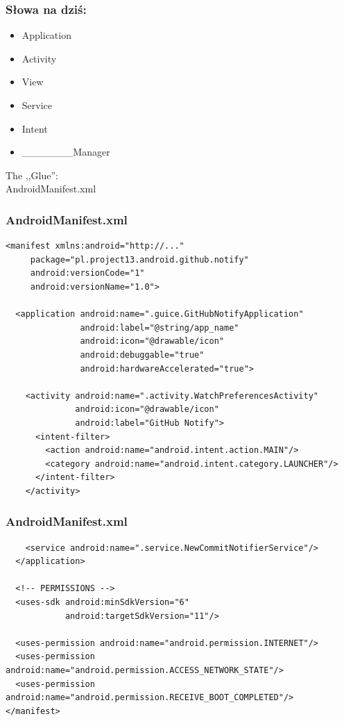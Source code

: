 \begin{frame}\frametitle{Słowa na dziś:}
 \begin{itemize}
  \item \Huge{Application}
  \item \Huge{Activity}
  \item \Huge{View}
  \item \Huge{Service}
  \item \Huge{Intent}
  \item \_\_\_\_\_\_\_\Huge{Manager}
 \end{itemize}
\end{frame}

\begin{frame}
\begin{center}
 \Huge{The ,,Glue'':}\\ 
 \Huge{AndroidManifest.xml}
\end{center}

\end{frame}


\begin{frame}[fragile]\frametitle{AndroidManifest.xml}
\begin{lstlisting}
<manifest xmlns:android="http://..."
     package="pl.project13.android.github.notify"
     android:versionCode="1"
     android:versionName="1.0">

  <application android:name=".guice.GitHubNotifyApplication"
               android:label="@string/app_name"
               android:icon="@drawable/icon"
               android:debuggable="true"
               android:hardwareAccelerated="true">

    <activity android:name=".activity.WatchPreferencesActivity"
              android:icon="@drawable/icon"
              android:label="GitHub Notify">
      <intent-filter>
        <action android:name="android.intent.action.MAIN"/>
        <category android:name="android.intent.category.LAUNCHER"/>
      </intent-filter>
    </activity>
\end{lstlisting}
\end{frame}

\begin{frame}[fragile]\frametitle{AndroidManifest.xml}
\begin{lstlisting}
    <service android:name=".service.NewCommitNotifierService"/>
  </application>

  <!-- PERMISSIONS -->
  <uses-sdk android:minSdkVersion="6"
            android:targetSdkVersion="11"/>

  <uses-permission android:name="android.permission.INTERNET"/>
  <uses-permission android:name="android.permission.ACCESS_NETWORK_STATE"/>
  <uses-permission android:name="android.permission.RECEIVE_BOOT_COMPLETED"/>
</manifest>
\end{lstlisting}
\end{frame}

